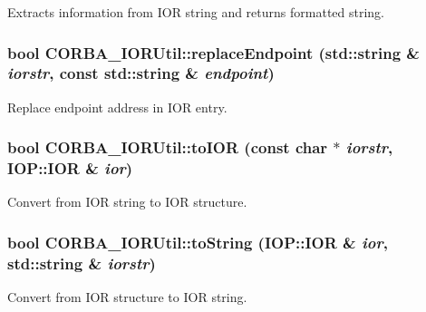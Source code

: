Extracts information from IOR string and returns formatted string. 

\subsubsection[{replaceEndpoint}]{\setlength{\rightskip}{0pt plus 5cm}bool CORBA\_\-IORUtil::replaceEndpoint (std::string \& {\em iorstr}, \/  const std::string \& {\em endpoint})}\label{namespaceCORBA__IORUtil_a0e12e01df775b2acfb22e1442ac69785}


Replace endpoint address in IOR entry. 

\subsubsection[{toIOR}]{\setlength{\rightskip}{0pt plus 5cm}bool CORBA\_\-IORUtil::toIOR (const char $\ast$ {\em iorstr}, \/  IOP::IOR \& {\em ior})}\label{namespaceCORBA__IORUtil_a72b91b72b943dbe26800d2e75c48c736}


Convert from IOR string to IOR structure. 

\subsubsection[{toString}]{\setlength{\rightskip}{0pt plus 5cm}bool CORBA\_\-IORUtil::toString (IOP::IOR \& {\em ior}, \/  std::string \& {\em iorstr})}\label{namespaceCORBA__IORUtil_a6b8cf0c6ed5a0140e249773ee2f6ceb0}


Convert from IOR structure to IOR string. 


